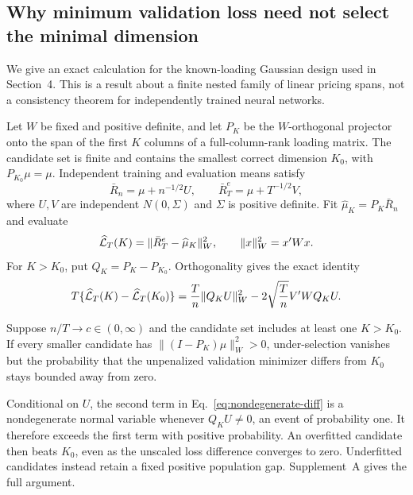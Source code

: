 \subsection{Why minimum validation loss need not select the minimal dimension}

We give an exact calculation for the known-loading Gaussian design used in Section~4. This is a result about a finite nested family of linear pricing spans, not a consistency theorem for independently trained neural networks.

Let $W$ be fixed and positive definite, and let $P_K$ be the $W$-orthogonal projector onto the span of the first $K$ columns of a full-column-rank loading matrix. The candidate set is finite and contains the smallest correct dimension $K_0$, with $P_{K_0}\mu=\mu$. Independent training and evaluation means satisfy
\begin{equation}
 \bar R_n=\mu+n^{-1/2}U,\qquad
 \bar R_T^{e}=\mu+T^{-1/2}V,
\end{equation}
where $U,V$ are independent $N(0,\Sigma)$ and $\Sigma$ is positive definite. Fit $\widehat\mu_K=P_K\bar R_n$ and evaluate
\begin{equation}
 \widehat{\mathcal{L}}_T(K)=\|\bar R_T^{e}-\widehat\mu_K\|_W^2,
 \qquad \|x\|_W^2=x'Wx.
\end{equation}
For $K>K_0$, put $Q_K=P_K-P_{K_0}$. Orthogonality gives the exact identity
\begin{equation}
 T\{\widehat{\mathcal{L}}_T(K)-\widehat{\mathcal{L}}_T(K_0)\}
 =\frac{T}{n}\|Q_KU\|_W^2
 -2\sqrt{\frac{T}{n}}V'WQ_KU.
 \label{eq:nondegenerate-diff}
\end{equation}

\begin{proposition}
\label{prop:inconsistency}
Suppose $n/T\to c\in(0,\infty)$ and the candidate set includes at least one $K>K_0$. If every smaller candidate has $\|(I-P_K)\mu\|_W^2>0$, under-selection vanishes but the probability that the unpenalized validation minimizer differs from $K_0$ stays bounded away from zero.
\end{proposition}

Conditional on $U$, the second term in Eq.~\eqref{eq:nondegenerate-diff} is a nondegenerate normal variable whenever $Q_KU\ne0$, an event of probability one. It therefore exceeds the first term with positive probability. An overfitted candidate then beats $K_0$, even as the unscaled loss difference converges to zero. Underfitted candidates instead retain a fixed positive population gap. Supplement~A gives the full argument.

